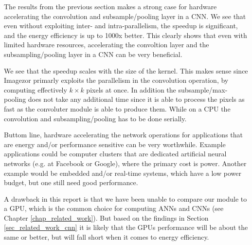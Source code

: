 The results from the previous section makes a strong case for hardware accelerating the convolution and subsample/pooling layer in a CNN. We see that even without exploiting inter- and intra-parallelism, the speedup is significant, and the energy efficiency is up to 1000x better. This clearly shows that even with limited hardware resources, accelerating the convoltion layer and the subsampling/pooling layer in a CNN can be very beneficial. 

We see that the speedup scales with the size of the kernel. This makes sense since Imagezor primarly exploits the parallelism in the convolution operation, by computing effectively $ k \times k $ pixels at once. In addition the subsample/max-pooling does not take any additional time since it is able to process the pixels as fast as the convoluter module is able to produce them. While on a CPU the convolution and subsampling/pooling has to be done serially.   

Buttom line, hardware accelerating the network operations for applications that are energy and/or performance sensitive can be very worthwhile. Example applications could be computer clusters that are dedicated artificial neural networks (e.g. at Facebook or Google), where the primary cost is power. Another example would be embedded and/or real-time systems, which have a low power budget, but one still need good performance. 

A drawback in this report is that we have been unable to compare our module to a GPU, which is the common choice for computing ANNs and CNNs (see Chapter \ref{chap_related_work}). But based on the findings in Section \ref{sec_related_work_cnn} it is likely that the GPUs performance will be about the same or better, but will fall short when it comes to energy efficiency. 
